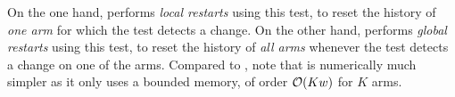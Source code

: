 On the one hand, \CUSUMUCB{} performs \emph{local restarts} using this test, to reset the history of \emph{one arm} for which the test detects a change.
On the other hand, \MUCB{} performs \emph{global restarts} using this test, to reset the history of \emph{all arms} whenever the test detects a change on one of the arms.
Compared to \CUSUMUCB{}, note that \MUCB{} is numerically much simpler as it only uses a bounded memory, of order $\mathop{}\mathopen{}\mathcal{O}\mathopen{}\left(K w\right)$ for $K$ arms.

